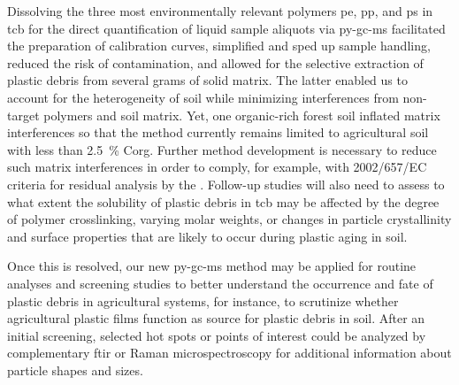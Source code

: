 Dissolving the three most environmentally relevant polymers \ac{pe}, \ac{pp}, and \ac{ps} in \ac{tcb} for the direct quantification of liquid sample aliquots via \ac{py-gc-ms} facilitated the preparation of calibration curves, simplified and sped up sample handling, reduced the risk of contamination, and allowed for the selective extraction of plastic debris from several grams of solid matrix.
The latter enabled us to account for the heterogeneity of soil while minimizing interferences from non-target polymers and soil matrix. Yet, one organic-rich forest soil inflated matrix interferences so that the method currently remains limited to agricultural soil with less than \SI{2.5}{\percent} \ac{Corg}. Further method development is necessary to reduce such matrix interferences in order to comply, for example, with 2002/657/EC criteria for residual analysis by the \citet{EuropeanCommissionCommission2002}. Follow-up studies will also need to assess to what extent the solubility of plastic debris in \ac{tcb} may be affected by the degree of polymer crosslinking, varying molar weights, or changes in particle crystallinity and surface properties that are likely to occur during plastic aging in soil.

Once this is resolved, our new \ac{py-gc-ms} method may be applied for routine analyses and screening studies to better understand the occurrence and fate of plastic debris in agricultural systems, for instance, to scrutinize whether agricultural plastic films function as source for plastic debris in soil. After an initial screening, selected hot spots or points of interest could be analyzed by complementary \ac{ftir} or Raman microspectroscopy for additional information about particle shapes and sizes.
